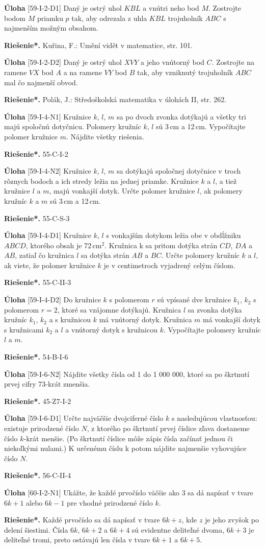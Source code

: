 \documentclass{article}
\newcommand{\rieh}{\textbf{Riešenie*.} }
\newcommand{\problem}[4]{
  \begin{tcolorbox}[breakable,notitle,boxrule=0pt,colback=light-gray,colframe=light-gray]
    \textbf{Úloha}
    [#1] #3
  \end{tcolorbox}
  \noindent#4
}
\begin{document}
\problem{59-I-2-D1}{}{
Daný je ostrý uhol $KBL$ a vnútri neho bod $M$. Zostrojte bodom $M$ priamku $p$ tak, aby odrezala z uhla $KBL$ trojuholník $ABC$ s najmenším možným obsahom.
}{
\rieh Kuřina, F.: Umění vidět v matematice, str. 101.
}


\problem{59-I-2-D2}{}{
Daný je ostrý uhol $XVY$ a jeho vnútorný bod $C$. Zostrojte na ramene $VX$ bod $A$ a na ramene $VY$ bod $B$ tak, aby vzniknutý trojuholník $ABC$ mal čo najmenší obvod.
}{
\rieh
Polák, J.: Středoškolská matematika v úlohách II, str. 262.
}


\problem{59-I-4-N1}{}{
Kružnice $k$, $l$, $m$ sa po dvoch zvonka dotýkajú a všetky tri majú spoločnú dotyčnicu.
Polomery kružníc $k$, $l$ sú 3\,cm a 12\,cm. Vypočítajte polomer kružnice $m$. Nájdite všetky riešenia.
}{
\rieh 55-C-I-2
}

\problem{59-I-4-N2}{}{
Kružnice $k$, $l$, $m$ sa dotýkajú spoločnej dotyčnice v troch rôznych bodoch a ich stredy
ležia na jednej priamke. Kružnice $k$ a $l$, a tiež kružnice $l$ a $m$, majú vonkajší dotyk.
Určte polomer kružnice $l$, ak polomery kružníc $k$ a $m$ sú 3\,cm a 12\,cm.
}{
\rieh 55-C-S-3
}


\problem{59-I-4-D1}{}{
Kružnice $k$, $l$ s vonkajším dotykom ležia obe v obdĺžniku $ABCD$, ktorého obsah je
72\,cm$^2$. Kružnica k sa pritom dotýka strán $CD$, $DA$ a $AB$, zatiaľ čo kružnica $l$ sa
dotýka strán $AB$ a $BC$. Určte polomery kružníc $k$ a $l$, ak viete, že polomer kružnice $k$ je v centimetroch vyjadrený celým číslom.
}{
\rieh 55-C-II-3
}

\problem{59-I-4-D2}{}{
Do kružnice $k$ s polomerom $r$ sú vpísané dve kružnice $k_1$, $k_2$ s polomerom $r=2$, ktoré
sa vzájomne dotýkajú. Kružnica $l$ sa zvonka dotýka kružníc $k_1$, $k_2$ a s kružnicou $k$ má vnútorný dotyk. Kružnica $m$ má vonkajší dotyk s kružnicami $k_2$ a $l$ a vnútorný dotyk s kružnicou $k$. Vypočítajte polomery kružníc $l$ a $m$.
}{
\rieh 54-B-I-6
}


\problem{59-I-6-N2}{}{
Nájdite všetky čísla od 1 do 1 000 000, ktoré sa po škrtnutí prvej cifry 73-krát zmenšia.
}{
\rieh 45-Z7-I-2
}


\problem{59-I-6-D1}{}{
Určte najväčšie dvojciferné číslo $k$ s nasledujúcou vlastnosťou: existuje prirodzené
číslo $N$, z ktorého po škrtnutí prvej číslice zľava dostaneme číslo $k$-krát menšie. (Po
škrtnutí číslice môže zápis čísla začínať jednou či niekoľkými nulami.) K určenému
číslu k potom nájdite najmenšie vyhovujúce číslo $N$.
}{
\rieh 56-C-II-4
}

\problem{60-I-2-N1}{}{
Ukážte, že každé prvočíslo väčšie ako 3 sa dá napísať v tvare $6k + 1$ alebo $6k - 1$ pre
vhodné prirodzené číslo $k$.
}{
\rieh Každé prvočíslo sa dá napísať v tvare $6k + z$, kde $z$ je jeho zvyšok po delení šiestimi. Čísla $6k$, $6k +2$ a $6k +4$ sú evidentne deliteľné dvoma, $6k +3$ je deliteľné tromi, preto ostávajú len čísla v tvare $6k + 1$ a $6k + 5$.
}
\end{document}
